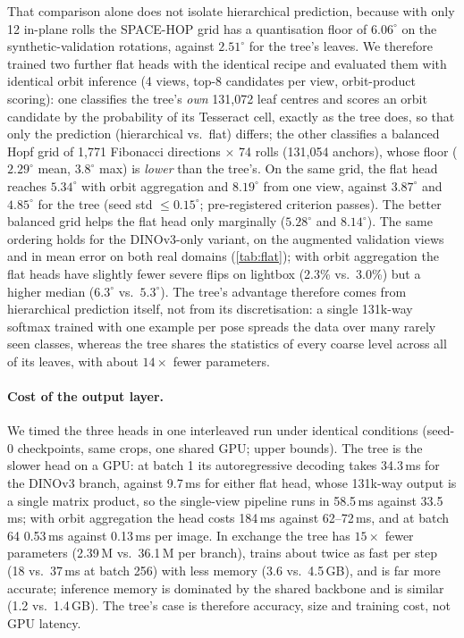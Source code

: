 That comparison alone does not isolate hierarchical prediction, because with only 12 in-plane rolls the SPACE-HOP grid has a quantisation floor of $6.06^\circ$ on the synthetic-validation rotations, against $2.51^\circ$ for the tree's leaves. We therefore trained two further flat heads with the identical recipe and evaluated them with identical orbit inference (4 views, top-8 candidates per view, orbit-product scoring): one classifies the tree's \emph{own} 131,072 leaf centres and scores an orbit candidate by the probability of its Tesseract cell, exactly as the tree does, so that only the prediction (hierarchical vs.\ flat) differs; the other classifies a balanced Hopf grid of 1,771 Fibonacci directions $\times$ 74 rolls (131,054 anchors), whose floor ($2.29^\circ$ mean, $3.8^\circ$ max) is \emph{lower} than the tree's. On the same grid, the flat head reaches $5.34^\circ$ with orbit aggregation and $8.19^\circ$ from one view, against $3.87^\circ$ and $4.85^\circ$ for the tree (seed std $\le0.15^\circ$; pre-registered criterion passes). The better balanced grid helps the flat head only marginally ($5.28^\circ$ and $8.14^\circ$). The same ordering holds for the DINOv3-only variant, on the augmented validation views and in mean error on both real domains (\cref{tab:flat}); with orbit aggregation the flat heads have slightly fewer severe flips on lightbox (2.3\% vs.\ 3.0\%) but a higher median ($6.3^\circ$ vs.\ $5.3^\circ$). The tree's advantage therefore comes from hierarchical prediction itself, not from its discretisation: a single 131k-way softmax trained with one example per pose spreads the data over many rarely seen classes, whereas the tree shares the statistics of every coarse level across all of its leaves, with about $14\times$ fewer parameters.

\paragraph{Cost of the output layer.} We timed the three heads in one interleaved run under identical conditions (seed-0 checkpoints, same crops, one shared GPU; upper bounds). The tree is the slower head on a GPU: at batch 1 its autoregressive decoding takes 34.3\,ms for the DINOv3 branch, against 9.7\,ms for either flat head, whose 131k-way output is a single matrix product, so the single-view pipeline runs in 58.5\,ms against 33.5\,ms; with orbit aggregation the head costs 184\,ms against 62--72\,ms, and at batch 64 0.53\,ms against 0.13\,ms per image. In exchange the tree has $15\times$ fewer parameters (2.39\,M vs.\ 36.1\,M per branch), trains about twice as fast per step (18 vs.\ 37\,ms at batch 256) with less memory (3.6 vs.\ 4.5\,GB), and is far more accurate; inference memory is dominated by the shared backbone and is similar (1.2 vs.\ 1.4\,GB). The tree's case is therefore accuracy, size and training cost, not GPU latency.

